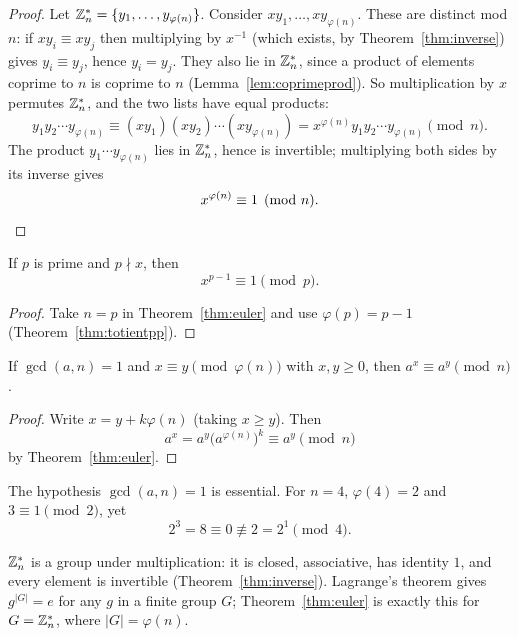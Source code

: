\documentclass[11pt]{article}
\begin{document}
\begin{proof}
Let $\mathbb{Z}_n^*=\{y_1,\dots,y_{\varphi(n)}\}$. Consider $xy_1,\dots,xy_{\varphi(n)}$. These are distinct mod $n$: if $xy_i\equiv xy_j$ then multiplying by $x^{-1}$ (which exists, by Theorem~\ref{thm:inverse}) gives $y_i\equiv y_j$, hence $y_i=y_j$. They also lie in $\mathbb{Z}_n^*$, since a product of elements coprime to $n$ is coprime to $n$ (Lemma~\ref{lem:coprimeprod}). So multiplication by $x$ permutes $\mathbb{Z}_n^*$, and the two lists have equal products:
\[
y_1y_2\cdots y_{\varphi(n)} \equiv (xy_1)(xy_2)\cdots(xy_{\varphi(n)}) = x^{\varphi(n)}y_1y_2\cdots y_{\varphi(n)} \pmod n.
\]
The product $y_1\cdots y_{\varphi(n)}$ lies in $\mathbb{Z}_n^*$, hence is invertible; multiplying both sides by its inverse gives
\[
x^{\varphi(n)}\equiv1\pmod n. \qedhere
\]
\end{proof}

\begin{corollary}
\label{thm:flt}
If $p$ is prime and $p\nmid x$, then
\[
x^{p-1}\equiv1\pmod p.
\]
\end{corollary}

\begin{proof}
Take $n=p$ in Theorem~\ref{thm:euler} and use $\varphi(p)=p-1$ (Theorem~\ref{thm:totientpp}).
\end{proof}

\begin{corollary}\label{cor:expred}
If $\gcd(a,n)=1$ and $x\equiv y\pmod{\varphi(n)}$ with $x,y\ge0$, then $a^x\equiv a^y\pmod n$.
\end{corollary}
\begin{proof}
Write $x=y+k\varphi(n)$ (taking $x\ge y$). Then
\[
a^x=a^y\bigl(a^{\varphi(n)}\bigr)^k\equiv a^y\pmod n
\]
by Theorem~\ref{thm:euler}.
\end{proof}
\begin{note}
The hypothesis $\gcd(a,n)=1$ is essential. For $n=4$, $\varphi(4)=2$ and $3\equiv1\pmod 2$, yet
\[
2^3=8\equiv0\not\equiv2=2^1\pmod 4.
\]
\end{note}

\begin{note}
$\mathbb{Z}_n^*$ is a group under multiplication: it is closed, associative, has identity $1$, and every element is invertible (Theorem~\ref{thm:inverse}). Lagrange's theorem gives $g^{|G|}=e$ for any $g$ in a finite group $G$; Theorem~\ref{thm:euler} is exactly this for $G=\mathbb{Z}_n^*$, where $|G|=\varphi(n)$.
\end{note}
\end{document}
